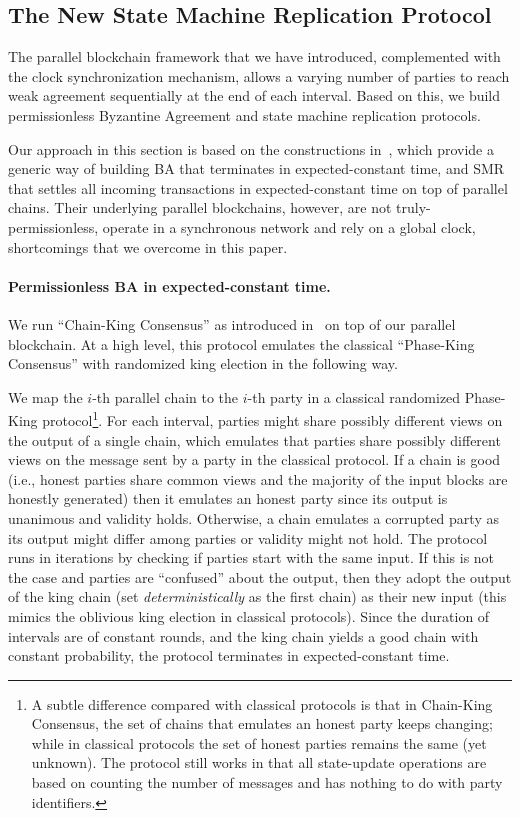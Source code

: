 \subsection{The New State Machine Replication Protocol}
\label{subsec:new-smr-protocol}

The parallel blockchain framework that we have introduced, complemented with the clock synchronization mechanism, allows a varying number of parties to reach weak agreement sequentially at the end of each interval.
%
Based on this, we build permissionless Byzantine Agreement and state machine replication protocols.

Our approach in this section is based on the constructions in~\cite{EC:GarKiaShe24}, which provide a generic way of building BA that terminates in expected-constant time, and SMR that settles all incoming transactions in expected-constant time on top of parallel chains.
%
Their underlying parallel blockchains, however, are not truly-permissionless, operate in a synchronous network and rely on a global clock, shortcomings that we overcome in this paper.

\paragraph{Permissionless BA in expected-constant time.}
%
We run ``Chain-King Consensus'' as introduced in~\cite{EC:GarKiaShe24} on top of our parallel blockchain.
%
At a high level, this protocol emulates the classical ``Phase-King Consensus'' \cite{ICALP:BerGar89,FOCS:BerGarPer89} with randomized king election \cite{PODC:FitGar03,C:KatKoo06} in the following way.

We map the $i$-th parallel chain to the $i$-th party in a classical randomized Phase-King protocol\footnote{A subtle difference compared with classical protocols is that in Chain-King Consensus, the set of chains that emulates an honest party keeps changing; while in classical protocols the set of honest parties remains the same (yet unknown). The protocol still works in that all state-update operations are based on counting the number of messages and has nothing to do with party identifiers.}.
%
For each interval, parties might share possibly different views on the output of a single chain, which emulates that parties share possibly different views on the message sent by a party in the classical protocol.
%
If a chain is good (i.e., honest parties share common views and the majority of the input blocks are honestly generated) then it emulates an honest party since its output is unanimous and validity holds.
%
Otherwise, a chain emulates a corrupted party as its output might differ among parties or validity might not hold.
%
The protocol runs in iterations by checking if parties start with the same input.
%
If this is not the case and parties are ``confused'' about the output, then they adopt the output of the king chain (set \emph{deterministically} as the first chain) as their new input (this mimics the oblivious king election in classical protocols).
%
Since the duration of intervals are of constant rounds, and the king chain yields a good chain with constant probability, the protocol terminates in expected-constant time.

